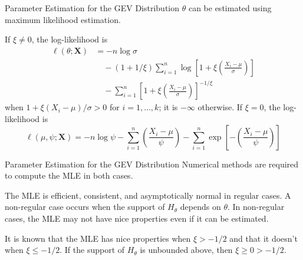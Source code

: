 \documentclass{beamer}
\begin{document}
\begin{frame}{Parameter Estimation for the GEV Distribution}
    $\theta$ can be estimated using maximum likelihood estimation.

    \medskip
    
    If $\xi \ne 0$, the log-likelihood is
    \begin{align*}
        \ell(\theta; \mathbf{X}) &= 
        -n\log\sigma \\
        &\quad - (1 + 1 / \xi)\sum_{i = 1}^n \log\left[1 + \xi\left(\frac{X_i - \mu}{\sigma}\right)\right] \\
        &\quad - \sum_{i = 1}^n \left[1 + \xi\left(\frac{X_i - \mu}{\sigma}\right)\right]^{-1 / \xi}
    \end{align*}
    when $1 + \xi(X_i - \mu) / \sigma > 0$ for $i = 1, \ldots, k$; it is $-\infty$ otherwise. If $\xi = 0$, the log-likelihood is
    \[
    \ell(\mu, \psi; \mathbf{X}) = -n\log\psi - \sum_{i = 1}^n \left(\frac{X_i - \mu}{\psi}\right) - \sum_{i = 1}^n \exp\left[-\left(\frac{X_i - \mu}{\psi}\right)\right]
    \]
\end{frame}

\begin{frame}{Parameter Estimation for the GEV Distribution}
    Numerical methods are required to compute the MLE in both cases.

    \medskip

    The MLE is efficient, consistent, and asymptotically normal in regular cases. A non-regular case occurs when the support of $H_{\theta}$ depends on $\theta$. In non-regular cases, the MLE may not have nice properties even if it can be estimated.

    \medskip

    It is known that the MLE has nice properties when $\xi > -1 / 2$ and that it doesn't when $\xi \le -1 / 2$. If the support of $H_{\theta}$ is unbounded above, then $\xi \ge 0 > -1 / 2$.
\end{frame}
\end{document}
